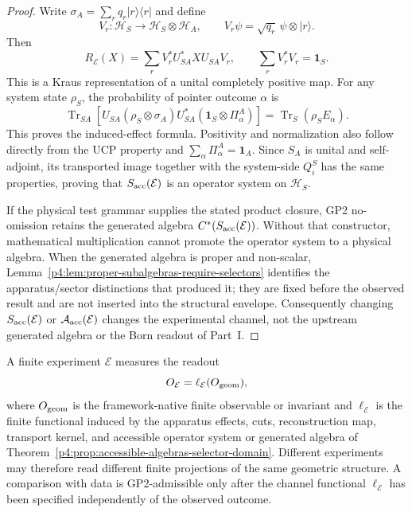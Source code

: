 \documentclass[12pt,a4paper]{article}
\begin{document}
\begin{proof}
Write
\(\sigma_A=\sum_rq_r\lvert r\rangle\langle r\rvert\) and define
\[
 V_r:\mathcal H_S\longrightarrow\mathcal H_S\otimes\mathcal H_A,
 \qquad
 V_r\psi=\sqrt{q_r}\,\psi\otimes\lvert r\rangle .
\]
Then
\[
 R_{\mathcal E}(X)
 =\sum_rV_r^*U_{SA}^*XU_{SA}V_r,
 \qquad
 \sum_rV_r^*V_r=\mathbf1_S.
\]
This is a Kraus representation of a unital completely positive map.
For any system state \(\rho_S\), the probability of pointer outcome \(\alpha\) is
\[
\operatorname{Tr}_{SA}\!\left[
U_{SA}(\rho_S\otimes\sigma_A)U_{SA}^*
(\mathbf1_S\otimes\Pi_\alpha^A)
\right]
=
\operatorname{Tr}_S(\rho_S E_\alpha).
\]
This proves the induced-effect formula.  Positivity and normalization also
follow directly from the UCP property and
\(\sum_\alpha\Pi_\alpha^A=\mathbf1_A\).  Since \(S_A\) is unital and
self-adjoint, its transported image together with the system-side \(Q_i^S\)
has the same properties, proving that \(S_{\rm acc}(\mathcal E)\) is an
operator system on \(\mathcal H_S\).

If the physical test grammar supplies the stated product closure, GP2
no-omission retains the generated algebra
\(C^*(S_{\rm acc}(\mathcal E))\).  Without that constructor, mathematical
multiplication cannot promote the operator system to a physical algebra.
When the generated algebra is proper and non-scalar,
Lemma~\ref{p4:lem:proper-subalgebras-require-selectors} identifies the
apparatus/sector distinctions that produced it; they are fixed before the
observed result and are not inserted into the structural envelope.
Consequently changing \(S_{\rm acc}(\mathcal E)\) or
\(\mathcal A_{\rm acc}(\mathcal E)\) changes the experimental channel, not
the upstream generated algebra or the Born readout of Part~I.
\end{proof}


\begin{corollary}
\label{p4:cor:channel-specific-readout}
A finite experiment \(\mathcal E\) measures the readout
\[
  O_{\mathcal E}=\ell_{\mathcal E}(O_{\rm geom}),
\]
where \(O_{\rm geom}\) is the framework-native finite observable or invariant and \(\ell_{\mathcal E}\) is the finite functional induced by the apparatus effects, cuts, reconstruction map, transport kernel, and accessible operator system or generated algebra of Theorem~\ref{p4:prop:accessible-algebras-selector-domain}.  Different experiments may therefore read different finite projections of the same geometric structure.  A comparison with data is GP2-admissible only after the channel functional \(\ell_{\mathcal E}\) has been specified independently of the observed outcome.
\end{corollary}
\end{document}
